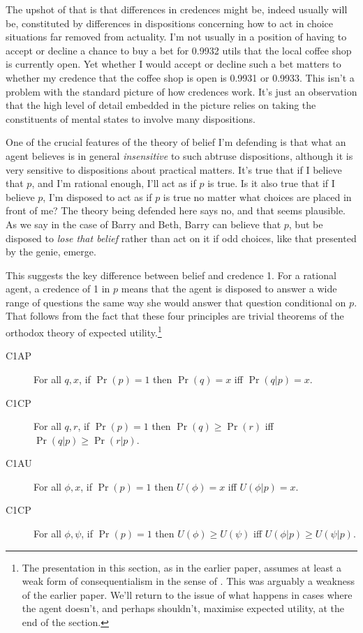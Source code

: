 The upshot of that is that differences in credences might be, indeed usually will be, constituted by differences in dispositions concerning how to act in choice situations far removed from actuality. I'm not usually in a position of having to accept or decline a chance to buy a bet for 0.9932 utils that the local coffee shop is currently open. Yet whether I would accept or decline such a bet matters to whether my credence that the coffee shop is open is 0.9931 or 0.9933. This isn't a problem with the standard picture of how credences work. It's just an observation that the high level of detail embedded in the picture relies on taking the constituents of mental states to involve many dispositions.

One of the crucial features of the theory of belief I'm defending is that what an agent believes is in general \textit{insensitive} to such abtruse dispositions, although it is very sensitive to dispositions about practical matters. It's true that if I believe that $p$, and I'm rational enough, I'll act as if $p$ is true. Is it also true that if I believe $p$, I'm disposed to act as if $p$ is true no matter what choices are placed in front of me? The theory being defended here says no, and that seems plausible. As we say in the case of Barry and Beth, Barry can believe that $p$, but be disposed to \textit{lose that belief} rather than act on it if odd choices, like that presented by the genie, emerge.

This suggests the key difference between belief and credence 1. For a rational agent, a credence of 1 in $p$ means that the agent is disposed to answer a wide range of questions the same way she would answer that question conditional on $p$. That follows from the fact that these four principles are trivial theorems of the orthodox theory of expected utility.\footnote{The presentation in this section, as in the earlier paper, assumes at least a weak form of consequentialism in the sense of \citet{Hammond1988}. This was arguably a weakness of the earlier paper. We'll return to the issue of what happens in cases where the agent doesn't, and perhaps shouldn't, maximise expected utility, at the end of the section.} 

\begin{description}
\item[C1AP] For all $q, x$, if $\Pr(p) = 1$ then $\Pr(q) = x$ iff $\Pr(q | p) = x$.
\item[C1CP] For all $q, r$, if $\Pr(p) = 1$ then $\Pr(q) \geq \Pr(r)$ iff $\Pr(q | p) \geq \Pr(r | p)$.
\item[C1AU] For all $\phi, x$, if $\Pr(p) = 1$ then $U(\phi) = x$ iff $U(\phi | p) = x$.
\item[C1CP] For all $\phi, \psi$, if $\Pr(p) = 1$ then $U(\phi) \geq U(\psi)$ iff $U(\phi | p) \geq U(\psi | p)$.
\end{description}

